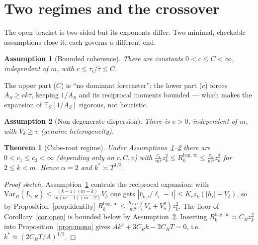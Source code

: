\documentclass[11pt]{article}
\newcommand{\E}{\mathbb{E}}
\newcommand{\Var}{\mathrm{Var}}
\newcommand{\Rk}{R_k^{\mathrm{bag},\infty}}
\newtheorem{assumption}{Assumption}
\newtheorem{theorem}{Theorem}
\begin{document}
\section{Two regimes and the crossover}\label{sec:regimes}
The open bracket is two-sided but its exponents differ. Two minimal, checkable assumptions
close it; each governs a different end.

\begin{assumption}[Bounded coherence]\label{ass:A}
There are constants $0<c\le C<\infty$, independent of $m$, with $c\le\tau_i/\bar\tau\le C$.
\end{assumption}
\noindent The upper part ($C$) is ``no dominant forecaster''; the lower part ($c$) forces
$A_S\ge ck\bar\tau$, keeping $1/A_S$ and its reciprocal moments bounded --- which makes the
expansion of $\E_S[1/A_S]$ rigorous, not heuristic.

\begin{assumption}[Non-degenerate dispersion]\label{ass:B}
There is $v>0$, independent of $m$, with $V_\delta\ge v$ (genuine heterogeneity).
\end{assumption}

\begin{theorem}[Cube-root regime]\label{thm:rate}
Under Assumptions~\ref{ass:A}--\ref{ass:B} there are $0<c_1\le c_2<\infty$ (depending only
on $c,C,v$) with $\frac{c_1}{m\bar\tau}z_k^2\le\Rk\le\frac{c_2}{m\bar\tau}z_k^2$ for
$2\le k<m$. Hence $\alpha=2$ and $k^\ast\asymp T^{1/3}$.
\end{theorem}
\begin{proof}[Proof sketch]
Assumption~\ref{ass:A} controls the reciprocal expansion: with
$\Var_R(L_{i,R})\le\frac{(k-1)(m-k)}{m(m-1)(m-2)}V_\delta$ one gets
$|\bar v_{k,i}/\ell_i-1|\le K_cz_k(|h_i|+V_\delta)$, so by Proposition~\ref{prop:identity}
$\Rk\le\frac{K_{c,C}}{m\bar\tau}(V_\delta+V_\delta^2)z_k^2$. The floor of
Corollary~\ref{cor:open} is bounded below by Assumption~\ref{ass:B}. Inserting
$\Rk\asymp C_Rz_k^2$ into Proposition~\ref{prop:mono} gives $Ak^3+3C_Rk-2C_RT=0$, i.e.\
$k^\ast\approx(2C_RT/A)^{1/3}$.
\end{proof}
\end{document}
